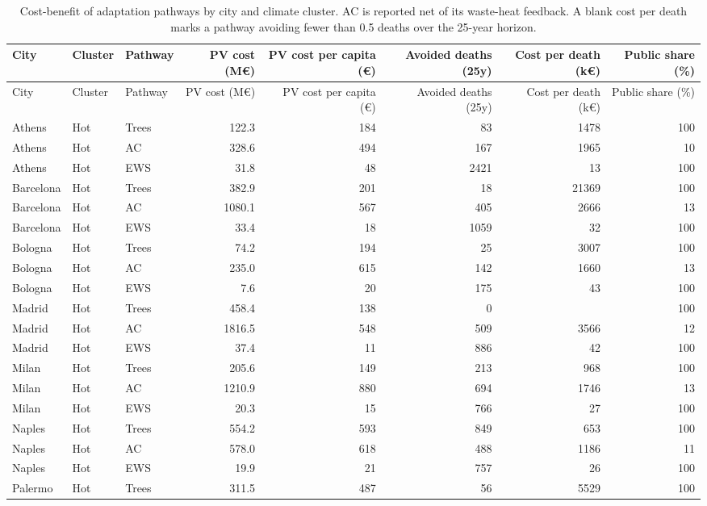 \begingroup\footnotesize
\begin{longtable}{lllrrrrr}
\caption{Cost-benefit of adaptation pathways by city and climate cluster. AC is reported net of its waste-heat feedback. A blank cost per death marks a pathway avoiding fewer than 0.5 deaths over the 25-year horizon.} \\ 
  \toprule
City & Cluster & Pathway & PV cost (M€) & PV cost per capita (€) & Avoided deaths (25y) & Cost per death (k€) & Public share (\%) \\ 
  \midrule
\endfirsthead
  \toprule
City & Cluster & Pathway & PV cost (M€) & PV cost per capita (€) & Avoided deaths (25y) & Cost per death (k€) & Public share (\%) \\ 
  \midrule
\endhead
Athens & Hot & Trees & 122.3 & 184 & 83 & 1478 & 100 \\ 
  Athens & Hot & AC & 328.6 & 494 & 167 & 1965 & 10 \\ 
  Athens & Hot & EWS & 31.8 & 48 & 2421 & 13 & 100 \\ 
  Barcelona & Hot & Trees & 382.9 & 201 & 18 & 21369 & 100 \\ 
  Barcelona & Hot & AC & 1080.1 & 567 & 405 & 2666 & 13 \\ 
  Barcelona & Hot & EWS & 33.4 & 18 & 1059 & 32 & 100 \\ 
  Bologna & Hot & Trees & 74.2 & 194 & 25 & 3007 & 100 \\ 
  Bologna & Hot & AC & 235.0 & 615 & 142 & 1660 & 13 \\ 
  Bologna & Hot & EWS & 7.6 & 20 & 175 & 43 & 100 \\ 
  Madrid & Hot & Trees & 458.4 & 138 & 0 &  & 100 \\ 
  Madrid & Hot & AC & 1816.5 & 548 & 509 & 3566 & 12 \\ 
  Madrid & Hot & EWS & 37.4 & 11 & 886 & 42 & 100 \\ 
  Milan & Hot & Trees & 205.6 & 149 & 213 & 968 & 100 \\ 
  Milan & Hot & AC & 1210.9 & 880 & 694 & 1746 & 13 \\ 
  Milan & Hot & EWS & 20.3 & 15 & 766 & 27 & 100 \\ 
  Naples & Hot & Trees & 554.2 & 593 & 849 & 653 & 100 \\ 
  Naples & Hot & AC & 578.0 & 618 & 488 & 1186 & 11 \\ 
  Naples & Hot & EWS & 19.9 & 21 & 757 & 26 & 100 \\ 
  Palermo & Hot & Trees & 311.5 & 487 & 56 & 5529 & 100 \\ 

\end{longtable}
